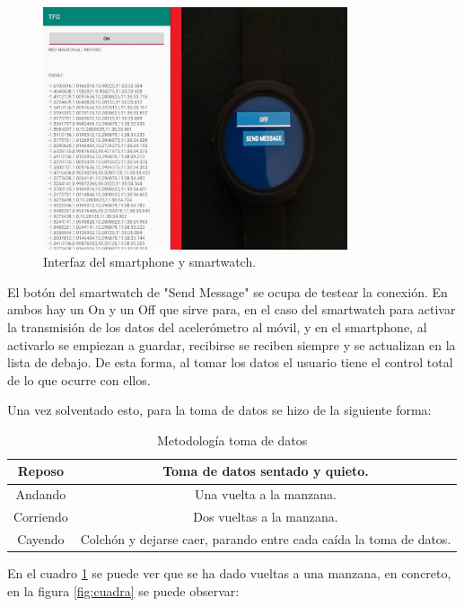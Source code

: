 \documentclass[12pt]{article}
\numberwithin{equation}{section}
\begin{document}
\begin{figure}[h]
    \centering
    \includegraphics[width=0.8\textwidth]{Interfaces.jpg}
    \caption{Interfaz del smartphone y smartwatch.}
    \label{fig:mesh2}
\end{figure}

El botón del smartwatch de "Send Message" se ocupa de testear la conexión. En ambos hay un On y un Off que sirve para, en el caso del smartwatch para activar la transmisión de los datos del acelerómetro al móvil, y en el smartphone, al activarlo se empiezan a guardar, recibirse se reciben siempre y se actualizan en la lista de debajo. De esta forma, al tomar los datos el usuario tiene el control total de lo que ocurre con ellos.

Una vez solventado esto, para la toma de datos se hizo de la siguiente forma:

\begin{center}
\begin{table}
\caption{Metodología toma de datos}
\begin{tabular}{| c | c |}
\hline
Reposo & Toma de datos sentado y quieto. \\
\hline
Andando & Una vuelta a la manzana. \\
\hline
Corriendo & Dos vueltas a la manzana. \\
\hline
Cayendo & Colchón y dejarse caer, parando entre cada caída la toma de datos. \\
\hline
\end{tabular}
\label{tabla1}
\end{table}
\end{center}

En el cuadro \ref{tabla1} se puede ver que se ha dado vueltas a una manzana, en concreto, en la figura \ref{fig:cuadra} se puede observar:
\end{document}
